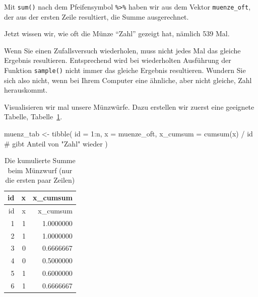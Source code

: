 \documentclass[
  a4paper,
  DIV=11]{scrreprt}
\newenvironment{Shaded}{\begin{snugshade}}{\end{snugshade}}
\newcommand{\AttributeTok}[1]{\textcolor[rgb]{0.40,0.45,0.13}{#1}}
\newcommand{\CommentTok}[1]{\textcolor[rgb]{0.37,0.37,0.37}{#1}}
\newcommand{\DecValTok}[1]{\textcolor[rgb]{0.68,0.00,0.00}{#1}}
\newcommand{\FunctionTok}[1]{\textcolor[rgb]{0.28,0.35,0.67}{#1}}
\newcommand{\NormalTok}[1]{\textcolor[rgb]{0.00,0.23,0.31}{#1}}
\newcommand{\OtherTok}[1]{\textcolor[rgb]{0.00,0.23,0.31}{#1}}
\newcommand{\SpecialCharTok}[1]{\textcolor[rgb]{0.37,0.37,0.37}{#1}}
\theoremstyle{definition}
\theoremstyle{remark}
\begin{document}
Mit \texttt{sum()} nach dem Pfeifensymbol \texttt{\%\textgreater{}\%}
haben wir aus dem Vektor \texttt{muenze\_oft}, der aus der ersten Zeile
resultiert, die Summe ausgerechnet.

Jetzt wissen wir, wie oft die Münze ``Zahl'' gezeigt hat, nämlich 539
Mal.

\begin{tcolorbox}[enhanced jigsaw, leftrule=.75mm, left=2mm, bottomrule=.15mm, opacityback=0, coltitle=black, colbacktitle=quarto-callout-note-color!10!white, opacitybacktitle=0.6, rightrule=.15mm, toptitle=1mm, colback=white, colframe=quarto-callout-note-color-frame, arc=.35mm, toprule=.15mm, breakable, titlerule=0mm, bottomtitle=1mm, title=\textcolor{quarto-callout-note-color}{\faInfo}\hspace{0.5em}{Hinweis}]
Wenn Sie einen Zufallsversuch wiederholen, muss nicht jedes Mal das
gleiche Ergebnis resultieren. Entsprechend wird bei wiederholten
Ausführung der Funktion \texttt{sample()} nicht immer das gleiche
Ergebnis resultieren. Wundern Sie sich also nicht, wenn bei Ihrem
Computer eine ähnliche, aber nicht gleiche, Zahl herauskommt.
\end{tcolorbox}

Visualisieren wir mal unsere Münzwürfe. Dazu erstellen wir zuerst eine
geeignete Tabelle, Tabelle~\ref{tbl-muenz}.

\begin{Shaded}
\begin{Highlighting}[]
\NormalTok{muenz\_tab }\OtherTok{\textless{}{-}}
  \FunctionTok{tibble}\NormalTok{(}
    \AttributeTok{id =} \DecValTok{1}\SpecialCharTok{:}\NormalTok{n,}
    \AttributeTok{x =}\NormalTok{ muenze\_oft,}
    \AttributeTok{x\_cumsum =} \FunctionTok{cumsum}\NormalTok{(x) }\SpecialCharTok{/}\NormalTok{ id  }\CommentTok{\# gibt Anteil von "Zahl" wieder}
\NormalTok{  )}
\end{Highlighting}
\end{Shaded}

\hypertarget{tbl-muenz}{}
\begin{longtable}[]{@{}rrr@{}}
\caption{\label{tbl-muenz}Die kumulierte Summe beim Münzwurf (nur die
ersten paar Zeilen)}\tabularnewline
\toprule()
id & x & x\_cumsum \\
\midrule()
\endfirsthead
\toprule()
id & x & x\_cumsum \\
\midrule()
\endhead
1 & 1 & 1.0000000 \\
2 & 1 & 1.0000000 \\
3 & 0 & 0.6666667 \\
4 & 0 & 0.5000000 \\
5 & 1 & 0.6000000 \\
6 & 1 & 0.6666667 \\
\bottomrule()
\end{longtable}
\end{document}
